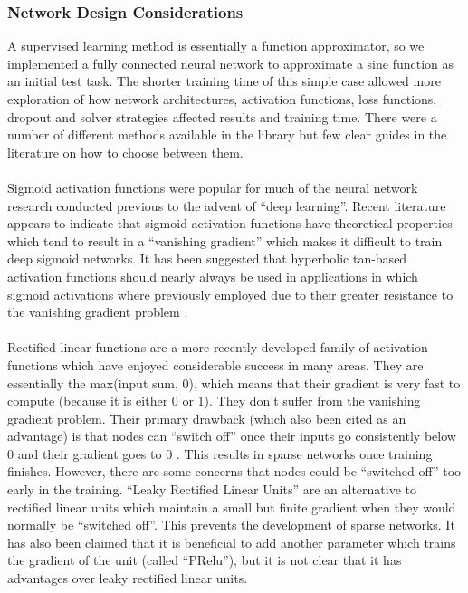 \documentclass[12pt]{article}
\begin{document}
\subsubsection{Network Design Considerations}
	A supervised learning method is essentially a function approximator, so we implemented a fully connected neural network to approximate a sine function as an initial test task.  The shorter training time of this simple case allowed more exploration of how network architectures, activation functions, loss functions, dropout and solver strategies affected results and training time.  There were a number of different methods available in the library but few clear guides in the literature on how to choose between them.\\
\\
	Sigmoid activation functions were popular for much of the neural network research conducted previous to the advent of “deep learning”.  Recent literature appears to indicate that sigmoid activation functions have theoretical properties which tend to result in a “vanishing gradient” which makes it difficult to train deep sigmoid networks.  It has been suggested that hyperbolic tan-based activation functions should nearly always be used in applications in which sigmoid activations where previously employed due to their greater resistance to the vanishing gradient problem \cite{tanHForumPost}.\\
\\  
	Rectified linear functions are a more recently developed family of activation functions which have enjoyed considerable success in many areas.  They are essentially the max(input sum, 0), which means that their gradient is very fast to compute (because it is either 0 or 1).  They don't suffer from the vanishing gradient problem.  Their primary drawback (which also been cited as an advantage) is that nodes can “switch off” once their inputs go consistently below 0 and their gradient goes to 0 \cite{glorot2011deep}.  This results in sparse networks once training finishes. However, there are some concerns that nodes could be “switched off” too early in the training.  “Leaky Rectified Linear Units” are an alternative to rectified linear units which maintain a small but finite gradient when they would normally be “switched off”.  This prevents the development of sparse networks.  It has also been claimed that it is beneficial to add another parameter which trains the gradient of the unit (called “PRelu”), but it is not clear that it has advantages over leaky rectified linear units.\\
\end{document}
